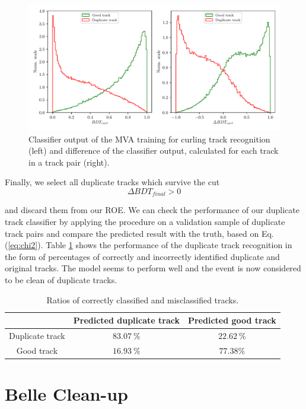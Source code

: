 \begin{figure}[H]
	\centering
	\captionsetup{width=0.8\linewidth}
	\includegraphics[width=\linewidth]{fig/ROECleanup_curl}
	\caption{Classifier output of the MVA training for curling track recognition (left) and difference of the classifier output, calculated for each track in a track pair (right).}
	\label{fig:ROE_curl}
\end{figure}

Finally, we select all duplicate tracks which survive the cut 
\begin{equation}
\Delta BDT_{final} > 0
\end{equation}

and discard them from our ROE. We can check the performance of our duplicate track classifier by applying the procedure on a validation sample of duplicate track pairs and compare the predicted result with the truth, based on Eq. (\ref{eq:chi2}). Table \ref{tab:rat} shows the performance of the duplicate track recognition in the form of percentages of correctly and incorrectly identified duplicate and original tracks. The model seems to perform well and the event is now considered to be clean of duplicate tracks.

\begin{table}[H]
	\centering
	\begin{tabular}{|c|c|c|}
		\hline
		& Predicted duplicate track & Predicted good track \\
		\hline 
		Duplicate track & $83.07~\%$  & $22.62~\%$  \\
		\hline
		Good track & $16.93~\%$ & $77.38\%$ \\
		\hline
	\end{tabular}
	\caption{Ratios of correctly classified and misclassified tracks.}
	\label{tab:rat}
\end{table}

\section{Belle Clean-up}

